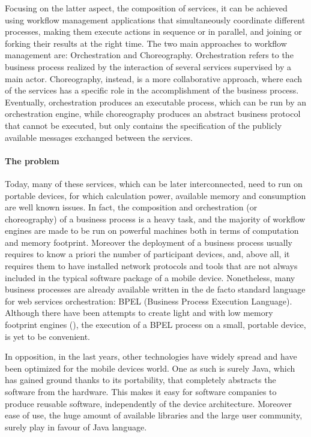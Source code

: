 Focusing on the latter aspect, the composition of services, it can be achieved using workflow management applications that simultaneously coordinate different processes, making them execute actions in sequence or in parallel, and joining or forking their results at the right time. %
The two main approaches to workflow management are: Orchestration and Choreography.
Orchestration refers to the %
business process realized by the interaction of several services supervised by a main actor. Choreography, instead, is a more collaborative approach, where each of the services has a specific role in the accomplishment of the business process. Eventually, orchestration produces an executable process, which can be run by an orchestration engine, while choreography produces an abstract business protocol that cannot be executed, but only contains the specification of the publicly available messages exchanged between the services.

\paragraph{The problem}
Today, many of these services, which can be later interconnected, need to run on portable devices, for which calculation power, available memory and consumption are well known issues. In fact, the composition and orchestration (or choreography) of a business process is a heavy task, and the majority of workflow engines are made to be run on powerful machines both in terms of computation and memory footprint. Moreover the deployment of a business process usually requires to know a priori the number of participant devices, and, above all, it requires them to have installed network protocols and tools that are not always included in the typical software package of a mobile device. 
Nonetheless, many business processes are already available written in the de facto standard language for web services orchestration: BPEL (Business Process Execution Language). Although there have been attempts to create light and with low memory footprint engines (\cite{bpelMobileEngineMora,bpelMobileEngineHackmann06sliver:a}), the execution of a BPEL process on a small, portable device, is yet to be convenient.

In opposition, in the last years, other technologies have widely spread and have been optimized for the mobile devices world. One as such is surely Java, which has gained ground thanks to its portability, that completely abstracts the software from the hardware. This makes it easy for software companies to produce reusable software, independently of the device architecture. Moreover ease of use, the huge amount of available libraries and the large user community, surely play in favour of Java language. 

